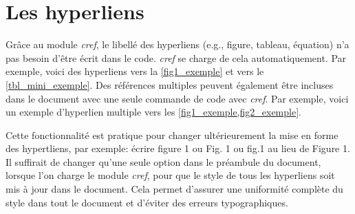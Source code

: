 \documentclass[../exemple_master.tex]{subfiles}
\begin{document}
\section{Les hyperliens}

Grâce au module \emph{cref}, le libellé des hyperliens (e.g., figure, tableau, équation) n'a pas besoin d'être écrit dans le code. \emph{cref} se charge de cela automatiquement. Par exemple, voici des hyperliens vers la \cref{fig1_exemple} et vers le \cref{tbl_mini_exemple}. Des références multiples peuvent également être incluses dans le document avec une seule commande de code avec \emph{cref}. Par exemple, voici un exemple d'hyperlien multiple vers les \cref{fig1_exemple,fig2_exemple}.

Cette fonctionnalité est pratique pour changer ultérieurement la mise en forme des hypertliens, par exemple: écrire figure 1 ou Fig. 1 ou fig.1 au lieu de Figure 1. Il suffirait de changer qu'une seule option dans le préambule du document, lorsque l'on charge le module \emph{cref}, pour que le style de tous les hyperliens soit mis à jour dans le document. Cela permet d'assurer une uniformité complète du style dans tout le document et d'éviter des erreurs typographiques.
\end{document}
